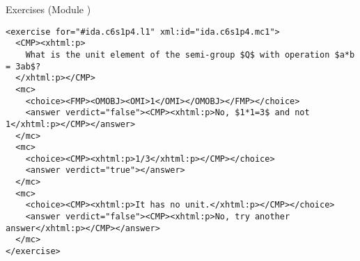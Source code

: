 \begin{tchapter}[id=quiz,short=Exercises]{Exercises (Module {})}
\begin{lstlisting}[label=lst:exercise,mathescape,
  caption={A Multiple-Choice Exercise in {\omdoc}},
  index={exercise,mc,choice,answer}]
<exercise for="#ida.c6s1p4.l1" xml:id="ida.c6s1p4.mc1">
  <CMP><xhtml:p>
    What is the unit element of the semi-group $Q$ with operation $a*b = 3ab$?
  </xhtml:p></CMP> 
  <mc>
    <choice><FMP><OMOBJ><OMI>1</OMI></OMOBJ></FMP></choice>
    <answer verdict="false"><CMP><xhtml:p>No, $1*1=3$ and not 1</xhtml:p></CMP></answer>
  </mc>
  <mc>
    <choice><CMP><xhtml:p>1/3</xhtml:p></CMP></choice>
    <answer verdict="true"></answer>
  </mc>
  <mc>
    <choice><CMP><xhtml:p>It has no unit.</xhtml:p></CMP></choice>
    <answer verdict="false"><CMP><xhtml:p>No, try another answer</xhtml:p></CMP></answer>
  </mc>
</exercise>
\end{lstlisting}
\end{tchapter}




